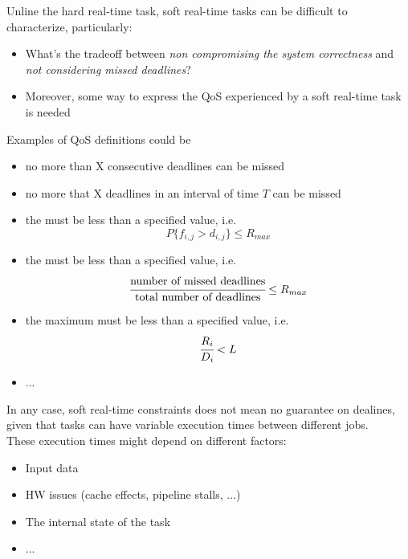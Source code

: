 Unline the hard real-time task, soft real-time tasks can be difficult to characterize, particularly:
\begin{itemize}
\item What's the tradeoff between \textit{non compromising the system correctness} and \textit{not considering missed deadlines}?
\item Moreover, some way to express the QoS experienced by a soft real-time task is needed
\end{itemize}

Examples of QoS definitions could be
\begin{itemize}
\item no more than X consecutive deadlines can be missed
\item no more that X deadlines in an interval of time $T$ can be missed
\item the  must be less than a specified value, i.e.
\[P\{f_{i,j} > d_{i,j}\} \le R_{max}\]
\item the  must be less than a specified value, i.e.
\[\cfrac{\text{number of missed deadlines}}{\text{total number of deadlines}} \le R_{max}\]
\item the maximum  must be less than a specified value, i.e.
\[\cfrac{R_i}{D_i} < L\]
\item ...
\end{itemize}



In any case, soft real-time constraints does not mean no guarantee on dealines, given that tasks can have variable execution times between different jobs.\\
These execution times might depend on different factors:
\begin{itemize}
\item Input data
\item HW issues (cache effects, pipeline stalls, ...)
\item The internal state of the task
\item ...
\end{itemize}

